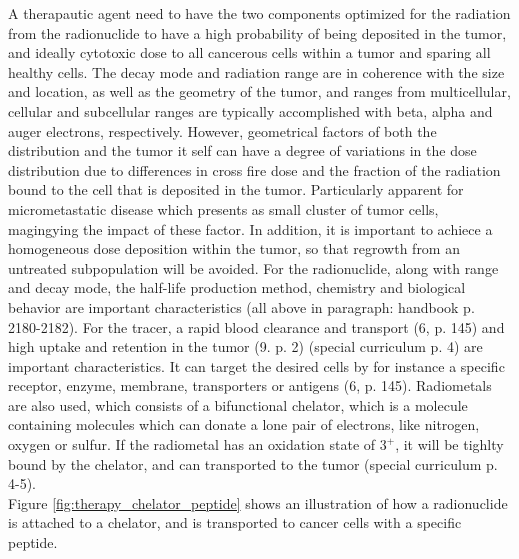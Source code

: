 A therapautic agent need to have the two components optimized for the radiation from the radionuclide to have a high probability of being deposited in the tumor, and ideally cytotoxic dose to all cancerous cells within a tumor and sparing all healthy cells. The decay mode and radiation range are in coherence with the size and location, as well as the geometry of the tumor, and ranges from multicellular, cellular and subcellular ranges are typically accomplished with beta, alpha and auger electrons, respectively. However, geometrical factors of both the distribution and the tumor it self can have a degree of variations in the dose distribution due to differences in cross fire dose and the fraction of the radiation bound to the cell that is deposited in the tumor. Particularly apparent for micrometastatic disease which presents as small cluster of tumor cells, magingying the impact of these factor. In addition, it is important to achiece a homogeneous dose deposition within the tumor, so that regrowth from an untreated subpopulation will be avoided. For the radionuclide, along with range and decay mode, the half-life production method, chemistry and biological behavior are important characteristics (all above in paragraph: handbook p. 2180-2182). For the tracer, a rapid blood clearance and transport (6, p. 145) and high uptake and retention in the tumor (9. p. 2)    (special curriculum p. 4) are important characteristics. It can target the desired cells by for instance a specific receptor, enzyme, membrane, transporters or antigens (6, p. 145). Radiometals are also used, which consists of a bifunctional chelator, which is a molecule containing molecules which can donate a lone pair of electrons, like nitrogen, oxygen or sulfur. If the radiometal has an oxidation state of $3^+$, it will be tighlty bound by the chelator, and can transported to the tumor (special curriculum p. 4-5). \\

Figure \ref{fig:therapy_chelator_peptide} shows an illustration of how a radionuclide is attached to a chelator, and is transported to cancer cells with a specific peptide. 

